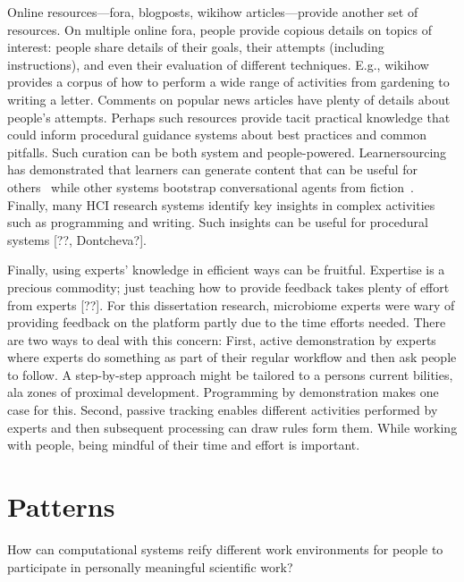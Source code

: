 Online resources---fora, blogposts, wikihow articles---provide another set of resources. On multiple online fora, people provide copious details on topics of interest: people share details of their goals, their attempts (including instructions), and even their evaluation of different techniques. E.g., wikihow provides a corpus of how to perform a wide range of activities from gardening to writing a letter. Comments on popular news articles have plenty of details about people's attempts. Perhaps such resources provide tacit practical knowledge that could inform procedural guidance systems about best practices and common pitfalls. Such curation can be both system and people-powered. Learnersourcing has demonstrated that learners can generate content that can be useful for others~\cite{Kim2015f} while other systems bootstrap conversational agents from fiction~\cite{fast2016empath}. Finally, many HCI research systems identify key insights in complex activities such as programming and writing. Such insights can be useful for procedural systems [??, Dontcheva?]. 

Finally, using experts' knowledge in efficient ways can be fruitful. Expertise is a precious commodity; just teaching how to provide feedback takes plenty of effort from experts [??]. For this dissertation research, microbiome experts were wary of providing feedback on the platform partly due to the time efforts needed. There are two ways to deal with this concern: First, active demonstration by experts where experts do something as part of their regular workflow and then ask people to follow. A step-by-step approach might be tailored to a person\textquotesingle s current bilities, ala zones of proximal development. Programming by demonstration makes one case for this. Second, passive tracking enables different activities performed by experts and then subsequent processing can draw rules form them. While working with people, being mindful of their time and effort is important.%


\section{Patterns} 
How can computational systems reify different work environments for people to participate in personally meaningful scientific work?

